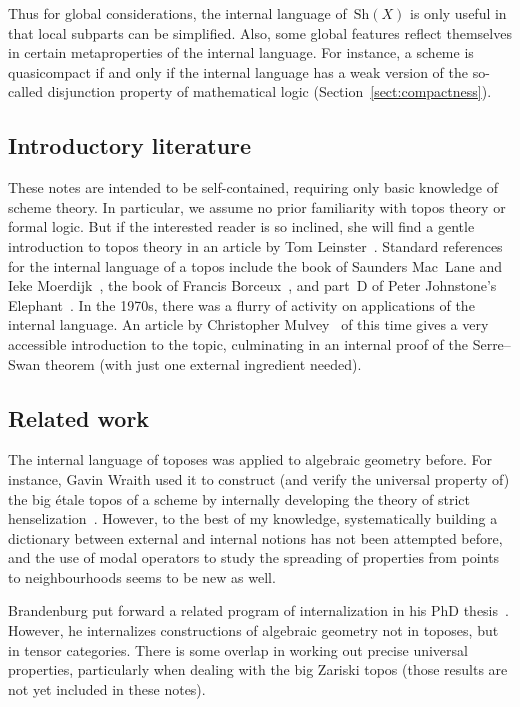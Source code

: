 \documentclass[10pt]{amsart}
\theoremstyle{definition}
\theoremstyle{plain}
\theoremstyle{remark}
\newcommand{\Sh}{\mathrm{Sh}}
\newcommand{\?}{\,{:}\,}
\renewcommand{\_}{\mathpunct{.}\,}
\begin{document}
Thus for global considerations, the internal language of~$\Sh(X)$ is only
useful in that local subparts can be simplified. Also, some global features
reflect themselves in certain metaproperties of the internal language. For
instance, a scheme is quasicompact if and only if the internal language
has a weak version of the so-called disjunction property of mathematical
logic (Section~\ref{sect:compactness}).


\subsection*{Introductory literature} These notes are intended
to be self-contained, requiring only basic knowledge of scheme theory. In
particular, we assume no prior familiarity with topos theory or formal logic.
But if the interested reader is so inclined, she will find a gentle
introduction to topos theory in an article by Tom
Leinster~\cite{leinster:introduction}. Standard references for the internal
language of a topos include the book of Saunders Mac~Lane and
Ieke Moerdijk~\cite[Chapter~VI]{moerdijk-maclane:sheaves-logic}, the book of
Francis Borceux~\cite[Chapter~6]{borceux:handbook3}, and part~D of
Peter Johnstone's Elephant~\cite{johnstone:elephant}. In the 1970s, there was a
flurry of activity on applications of the internal language. An article by
Christopher Mulvey~\cite{mulvey:repr} of this time gives a very accessible
introduction to the topic, culminating in an internal proof of the Serre--Swan
theorem (with just one external ingredient needed).


\subsection*{Related work} The internal language of toposes was applied to algebraic geometry before. For
instance, Gavin Wraith used it to construct (and verify the universal property
of) the big étale topos of a scheme by internally developing the theory of
strict henselization~\cite{wraith:generic-galois-theory}. However, to the best
of my knowledge, systematically building a dictionary between external and
internal notions has not been attempted before, and the use of modal operators
to study the spreading of properties from points to neighbourhoods seems to be
new as well.

Brandenburg put forward a related program of internalization in his PhD
thesis~\cite{brandenburg:tensor-foundations}. However, he internalizes
constructions of algebraic geometry not in toposes, but in tensor categories.
There is some overlap in working out precise universal properties, particularly
when dealing with the big Zariski topos (those results are not yet included in
these notes).
\end{document}
